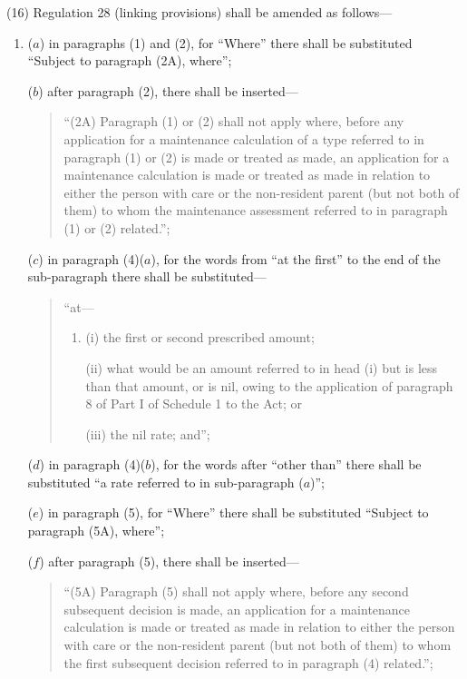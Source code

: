 \documentclass[12pt,a4paper]{article}
\begin{document}
(16) Regulation 28 (linking provisions) shall be amended as follows—
\begin{enumerate}\item[]
($a$) in paragraphs (1) and (2), for “Where” there shall be substituted “Subject to paragraph (2A), where”;

($b$) after paragraph (2), there shall be inserted—
\begin{quotation}
“(2A) Paragraph (1) or (2) shall not apply where, before any application for a maintenance calculation of a type referred to in paragraph (1) or (2) is made or treated as made, an application for a maintenance calculation is made or treated as made in relation to either the person with care or the non-resident parent (but not both of them) to whom the maintenance assessment referred to in paragraph (1) or (2) related.”;
\end{quotation}

($c$) in paragraph (4)($a$), for the words from “at the first” to the end of the sub-paragraph there shall be substituted—
\begin{quotation}
    “at—
\begin{enumerate}\item[]
    (i) 
    the first or second prescribed amount;

    (ii) 
    what would be an amount referred to in head (i)  but is less than that amount, or is nil, owing to the application of paragraph 8 of Part I of Schedule 1 to the Act; or

    (iii) 
    the nil rate; and”; 
\end{enumerate}
\end{quotation}

($d$) in paragraph (4)($b$), for the words after “other than” there shall be substituted “a rate referred to in sub-paragraph ($a$)”;

($e$) in paragraph (5), for “Where” there shall be substituted “Subject to paragraph (5A), where”;

($f$) after paragraph (5), there shall be inserted—
\begin{quotation}
“(5A) Paragraph (5) shall not apply where, before any second subsequent decision is made, an application for a maintenance calculation is made or treated as made in relation to either the person with care or the non-resident parent (but not both of them) to whom the first subsequent decision referred to in paragraph (4) related.”;
\end{quotation}


\end{enumerate}
\end{document}
